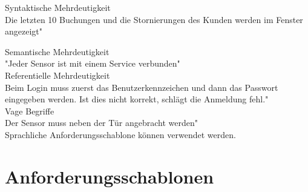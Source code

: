 Syntaktische Mehrdeutigkeit \\
Die letzten 10 Buchungen und die Stornierungen des Kunden werden im Fenster angezeigt"

Semantische Mehrdeutigkeit \\
"Jeder Sensor ist mit einem Service verbunden" \\

Referentielle Mehrdeutigkeit \\
Beim Login muss zuerst das Benutzerkennzeichen und dann das Passwort eingegeben werden. Ist dies nicht korrekt, schlägt die Anmeldung fehl." \\

Vage Begriffe \\
Der Sensor muss neben der Tür angebracht werden" \\

Sprachliche Anforderungsschablone können verwendet werden.

\section{Anforderungsschablonen}

